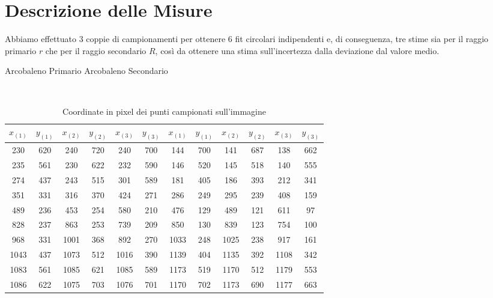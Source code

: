 \documentclass{report}[a4paper,11pt]
\begin{document}
\section{Descrizione delle Misure}
Abbiamo effettuato $3$ coppie di campionamenti per ottenere $6$ fit circolari indipendenti e, di conseguenza, tre stime sia per il raggio primario $r$ che per il raggio secondario $R$, così da ottenere una stima sull'incertezza dalla deviazione dal valore medio.
\begin{table}[!htb]
  \begin{center}
  \begin{large}
  Arcobaleno Primario  \qquad \qquad \qquad \space Arcobaleno Secondario
  \end{large}\\
	\begin{tabular}{cccccc|cccccc}
	\toprule
	$x_{(1)}$  & $y_{(1)}$  & $x_{(2)}$  & $y_{(2)}$  & $x_{(3)}$  & $y_{(3)}$  & $x_{(1)}$  & $y_{(1)}$  & $x_{(2)}$  & $y_{(2)}$  & $x_{(3)}$  & $y_{(3)}$  \\
	\midrule
	\midrule
	230 & 620 & 240 & 720 & 240 & 700 & 144 & 700 & 141 & 687 & 138 & 662 \\ 
	 
	235 & 561 & 230 & 622 & 232 & 590 & 146 & 520 & 145 & 518 & 140 & 555 \\ 
	 
	274 & 437 & 243 & 515 & 301 & 589 & 181 & 405 & 186 & 393 & 212 & 341 \\ 
	 
	351 & 331 & 316 & 370 & 424 & 271 & 286 & 249 & 295 & 239 & 408 & 159 \\ 
	 
	489 & 236 & 453 & 254 & 580 & 210 & 476 & 129 & 489 & 121 & 611 & 97 \\ 
	 
	828 & 237 & 863 & 253 & 739 & 209 & 850 & 130 & 839 & 123 & 754 & 100 \\ 
	 
	968 & 331 & 1001 & 368 & 892 & 270 & 1033 & 248 & 1025 & 238 & 917 & 161 \\ 
	 
	1043 & 437 & 1073 & 512 & 1016 & 390 & 1139 & 404 & 1135 & 392 & 1108 & 342 \\ 
	 
	1083 & 561 & 1085 & 621 & 1085 & 589 & 1173 & 519 & 1170 & 512 & 1179 & 553 \\ 
	 
	1086 & 622 & 1075 & 703 & 1076 & 701 & 1170 & 702 & 1173 & 690 & 1177 & 663 \\ 
	\bottomrule
	\end{tabular}
  \end{center}
  \caption{Coordinate in pixel dei punti campionati sull'immagine\label{tab:arcpoints}}
\end{table}
\end{document}
